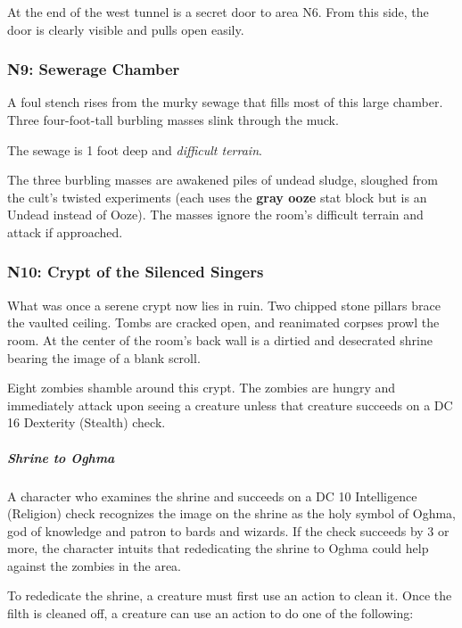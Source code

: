\documentclass[10pt,a4paper,twoside,fancy,bg=print,twocolumn,openany,nodeprecatedcode]{dndbook}
\begin{document}
At the end of the west tunnel is a secret door to area N6. From this side, the door is clearly visible and pulls open easily.

\subsubsection{N9: Sewerage Chamber}
\begin{DndReadAloud}{}
A foul stench rises from the murky sewage that fills most of this large chamber. Three four-foot-tall burbling masses slink through the muck.

\end{DndReadAloud}

The sewage is 1 foot deep and \textit{difficult terrain}.

The three burbling masses are awakened piles of undead sludge, sloughed from the cult's twisted experiments (each uses the \textbf{gray ooze} stat block but is an Undead instead of Ooze). The masses ignore the room's difficult terrain and attack if approached.

\subsubsection{N10: Crypt of the Silenced Singers}
\begin{DndReadAloud}{}
What was once a serene crypt now lies in ruin. Two chipped stone pillars brace the vaulted ceiling. Tombs are cracked open, and reanimated corpses prowl the room. At the center of the room's back wall is a dirtied and desecrated shrine bearing the image of a blank scroll.

\end{DndReadAloud}

Eight zombies shamble around this crypt. The zombies are hungry and immediately attack upon seeing a creature unless that creature succeeds on a DC 16 Dexterity (Stealth) check.

\subparagraph{Shrine to Oghma}
A character who examines the shrine and succeeds on a DC 10 Intelligence (Religion) check recognizes the image on the shrine as the holy symbol of Oghma, god of knowledge and patron to bards and wizards. If the check succeeds by 3 or more, the character intuits that rededicating the shrine to Oghma could help against the zombies in the area.

To rededicate the shrine, a creature must first use an action to clean it. Once the filth is cleaned off, a creature can use an action to do one of the following:
\end{document}
